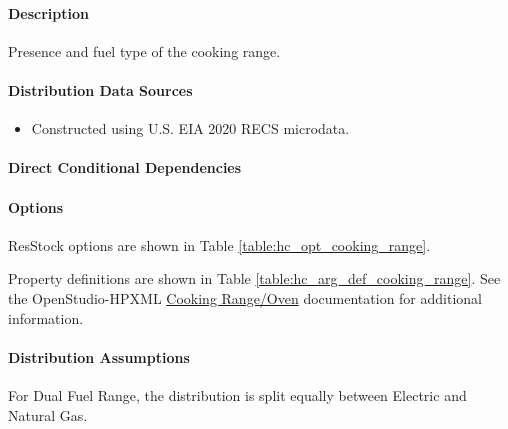 \paragraph{Description}
% 
Presence and fuel type of the cooking range.

\paragraph{Distribution Data Sources}
% 
\begin{itemize}
\item 

Constructed using U.S. EIA 2020 RECS microdata. 
\end{itemize}

\paragraph{Direct Conditional Dependencies}


\paragraph{Options}
ResStock options are shown in Table \ref{table:hc_opt_cooking_range}.



Property definitions are shown in Table \ref{table:hc_arg_def_cooking_range}. See the OpenStudio-HPXML \href{https://openstudio-hpxml.readthedocs.io/en/v1.10.0/workflow_inputs.html#hpxml-cooking-range-oven}{Cooking Range/Oven} documentation for additional information.



\paragraph{Distribution Assumptions}
% 
For Dual Fuel Range, the distribution is split equally between Electric and Natural Gas. 

